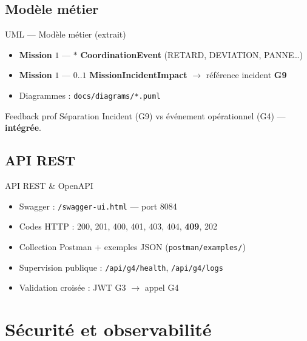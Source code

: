 \documentclass[aspectratio=169,xcolor=table]{beamer}
\begin{document}
\subsection{Modèle métier}

\begin{frame}{UML — Modèle métier (extrait)}
  \footnotesize
  \begin{itemize}
    \item \textbf{Mission} $1$ — $*$ \textbf{CoordinationEvent} (RETARD, DEVIATION, PANNE…)
    \item \textbf{Mission} $1$ — $0..1$ \textbf{MissionIncidentImpact} $\rightarrow$ référence incident \textbf{G9}
    \item Diagrammes : \texttt{docs/diagrams/*.puml}
  \end{itemize}
  \vspace{0.4cm}
  \begin{block}{Feedback prof}
    Séparation Incident (G9) vs événement opérationnel (G4) — \textbf{intégrée}.
  \end{block}
\end{frame}

\subsection{API REST}

\begin{frame}{API REST \& OpenAPI}
  \begin{itemize}
    \item Swagger : \texttt{/swagger-ui.html} — port 8084
    \item Codes HTTP : 200, 201, 400, 401, 403, 404, \textbf{409}, 202
    \item Collection Postman + exemples JSON (\texttt{postman/examples/})
    \item Supervision publique : \texttt{/api/g4/health}, \texttt{/api/g4/logs}
    \item Validation croisée : JWT G3 $\rightarrow$ appel G4
  \end{itemize}
\end{frame}

\section{Sécurité et observabilité}
\end{document}
